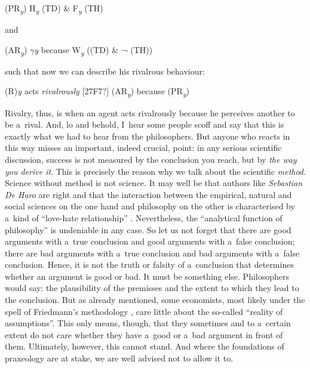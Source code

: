 (PR\textit{\textsubscript{y}}) H\textit{\textsubscript{y}} (TD) \& F\textit{\textsubscript{y}} (TH)



and



(AR\textit{\textsubscript{y}}) \textit{$\gamma $y} because W\textit{\textsubscript{y}} ((TD) \& ¬ (TH))



such that now we can describe his rivalrous behaviour:



(R)\textit{y} acts \textit{rivalrously} [27F7?] (AR\textit{\textsubscript{y}}) because (PR\textit{\textsubscript{y}})



Rivalry, thus, is when an agent acts rivalrously because he perceives another to be a~rival. And, lo and behold, I~hear some people scoff and say that this is exactly what we had to hear from the philosophers. But anyone who reacts in this way misses an important, indeed crucial, point: in any serious scientific discussion, success is not measured by the conclusion you reach, but by \textit{the way you derive it}. This is precisely the reason why we talk about the scientific \textit{method}. Science without method is not science. It may well be that authors like \textit{Sebastian De Haro} are right and that the interaction between the empirical, natural and social sciences on the one hand and philosophy on the other is characterised by a~kind of ``love-hate relationship'' 
\parencite[][]{de_haro_science_2020}. %
 Nevertheless, the ``analytical function of philosophy'' 
\parencite[][p.304f.]{de_haro_science_2020} %
 is undeniable in any case. So let us not forget that there are good arguments with a~true conclusion and good arguments with a~false conclusion; there are bad arguments with a~true conclusion and bad arguments with a~false conclusion. Hence, it is not the truth or falsity of a~conclusion that determines whether an argument is good or bad. It must be something else. Philosophers would say: the plausibility of the premisses and the extent to which they lead to the conclusion. But as already mentioned, some economists, most likely under the spell of Friedmann's methodology 
\parencite[][]{},%
care little about the so-called ``reality of assumptions''. This only means, though, that they sometimes and to a~certain extent do not care whether they have a~good or a~bad argument in front of them. Ultimately, however, this cannot stand. And where the foundations of praxeology are at stake, we are well advised not to allow it to.



